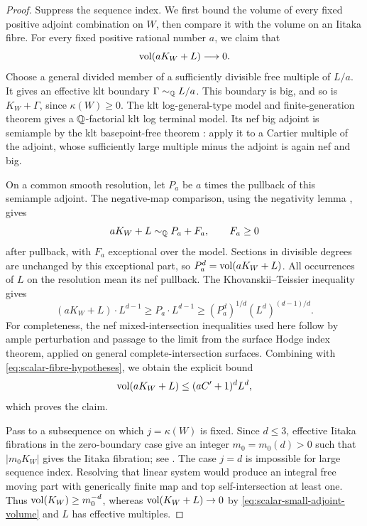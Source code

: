 \begin{proof}
Suppress the sequence index.  We first bound the volume of every fixed
positive adjoint combination on $W$, then compare it with the volume on
an Iitaka fibre.
For every fixed positive rational number $a$, we claim that
\begin{equation}\label{eq:scalar-small-adjoint-volume}
 \operatorname{vol}(aK_W+L)\longrightarrow0.
\end{equation}
Choose a general divided member of a sufficiently divisible free
multiple of $L/a$.  It gives an effective klt boundary
$\Gamma\sim_{\mathbb Q}L/a$.  This boundary is big, and so is
$K_W+\Gamma$, since $\kappa(W)\ge0$.
The klt log-general-type model and finite-generation theorem
\cite[Theorem~1.2]{BCHM2010} gives a $\mathbb Q$-factorial klt log terminal model.
Its nef big adjoint is semiample by the klt basepoint-free theorem
\cite[Theorem~3.3]{KollarMori1998}: apply it to a Cartier multiple of
the adjoint, whose sufficiently large multiple minus the adjoint is
again nef and big.

On a common smooth resolution, let $P_a$ be $a$ times the pullback of
this semiample adjoint.  The negative-map comparison, using the
negativity lemma \cite[Lemma~3.39]{KollarMori1998}, gives
\[
 aK_W+L\sim_{\mathbb Q}P_a+F_a,
 \qquad F_a\ge0
\]
after pullback, with $F_a$ exceptional over the model.  Sections in
divisible degrees are unchanged by this exceptional part, so
$P_a^d=\operatorname{vol}(aK_W+L)$.  All occurrences of $L$ on the resolution mean
its nef pullback.  The Khovanskii--Teissier inequality gives
\[
 (aK_W+L)\cdot L^{d-1}
 \ge P_a\cdot L^{d-1}
 \ge (P_a^d)^{1/d}(L^d)^{(d-1)/d}.
\]
For completeness, the nef mixed-intersection inequalities used here
follow by ample perturbation and passage to the limit from the
surface Hodge index theorem, applied on general complete-intersection
surfaces.  Combining with \eqref{eq:scalar-fibre-hypotheses}, we
obtain the explicit bound
\begin{equation}\label{eq:scalar-volume-bound}
 \operatorname{vol}(aK_W+L)\le (aC'+1)^dL^d,
\end{equation}
which proves the claim.

Pass to a subsequence on which $j=\kappa(W)$ is fixed.
Since $d\le3$, effective Iitaka fibrations in the zero-boundary case
give an integer $m_0=m_0(d)>0$ such that $|m_0K_W|$ gives the Iitaka
fibration; see \cite[Corollary~1.5]{ChenHanLiu2023}.
The case $j=d$ is impossible for large sequence index.  Resolving
that linear system would produce an integral free moving part with
generically finite map and top self-intersection at least one.  Thus
$\operatorname{vol}(K_W)\ge m_0^{-d}$, whereas
$\operatorname{vol}(K_W+L)\to0$ by \eqref{eq:scalar-small-adjoint-volume} and
$L$ has effective multiples.


\end{proof}
